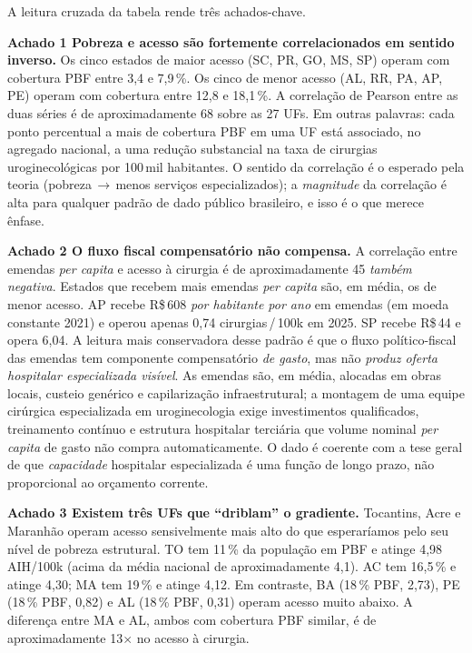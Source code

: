 \documentclass[12pt,a4paper,oneside]{article}
\newcommand{\rs}{R\$\,}
\begin{document}
A leitura cruzada da tabela rende três achados-chave.

\textbf{Achado 1 \textemdash{} Pobreza e acesso são fortemente
correlacionados em sentido inverso.} Os cinco estados de maior
acesso (SC, PR, GO, MS, SP) operam com cobertura PBF entre
3{,}4 e 7{,}9\,\%. Os cinco de menor acesso (AL, RR, PA, AP,
PE) operam com cobertura entre 12{,}8 e 18{,}1\,\%. A correlação
de Pearson entre as duas séries é de aproximadamente
68 sobre as 27 UFs. Em outras palavras: cada
ponto percentual a mais de cobertura PBF em uma UF está
associado, no agregado nacional, a uma redução substancial na
taxa de cirurgias uroginecológicas por 100\,mil habitantes. O
sentido da correlação é o esperado pela teoria
(pobreza\,$\rightarrow$\,menos serviços especializados); a
\textit{magnitude} da correlação é alta para qualquer padrão
de dado público brasileiro, e isso é o que merece ênfase.

\textbf{Achado 2 \textemdash{} O fluxo fiscal compensatório não
compensa.} A correlação entre emendas \textit{per capita} e
acesso à cirurgia é de aproximadamente 45
\textemdash{} \textit{também negativa}. Estados que recebem
mais emendas \textit{per capita} são, em média, os de menor
acesso. AP recebe \rs 608 \textit{por habitante por ano} em
emendas (em moeda constante 2021) e operou apenas 0{,}74
cirurgias\,/\,100k em 2025. SP recebe \rs 44 e opera 6{,}04.
A leitura mais conservadora desse padrão é que o fluxo
político-fiscal das emendas tem componente compensatório
\textit{de gasto}, mas não \textit{produz oferta hospitalar
especializada visível}. As emendas são, em média, alocadas em
obras locais, custeio genérico e capilarização infraestrutural;
a montagem de uma equipe cirúrgica especializada em
uroginecologia exige investimentos qualificados, treinamento
contínuo e estrutura hospitalar terciária que volume nominal
\textit{per capita} de gasto não compra automaticamente. O dado
é coerente com a tese geral de que \textit{capacidade}
hospitalar especializada é uma função de longo prazo, não
proporcional ao orçamento corrente.

\textbf{Achado 3 \textemdash{} Existem três UFs que ``driblam''
o gradiente.} Tocantins, Acre e Maranhão operam acesso
sensivelmente mais alto do que esperaríamos pelo seu nível de
pobreza estrutural. TO tem 11\,\% da população em PBF e atinge
4{,}98 AIH/100k (acima da média nacional de aproximadamente
4{,}1). AC tem 16{,}5\,\% e atinge 4{,}30; MA tem 19\,\% e
atinge 4{,}12. Em contraste, BA (18\,\% PBF, 2{,}73), PE (18\,\%
PBF, 0{,}82) e AL (18\,\% PBF, 0{,}31) operam acesso muito
abaixo. A diferença entre MA e AL, ambos com cobertura PBF
similar, é de aproximadamente 13$\times$ no acesso à cirurgia.
\end{document}

